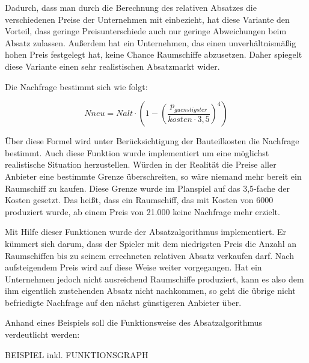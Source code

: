 Dadurch, dass man durch die Berechnung des relativen Absatzes die verschiedenen Preise der Unternehmen mit einbezieht, hat
diese Variante den Vorteil, dass geringe Preisunterschiede auch nur geringe Abweichungen beim Absatz zulassen. Außerdem hat
ein Unternehmen, das einen unverhältnismäßig hohen Preis festgelegt hat, keine Chance Raumschiffe abzusetzen. Daher spiegelt
diese Variante einen sehr realistischen Absatzmarkt wider.

Die Nachfrage bestimmt sich wie folgt:

\begin{equation}
     N{neu} = N{alt} \cdot (1 - (\frac{p_{guenstigster}}{kosten \cdot 3,5})^4)
     \label{alg:spielwelt-logik-absatzmengen-3}
\end{equation}

Über diese Formel wird unter Berücksichtigung der Bauteilkosten die Nachfrage bestimmt. Auch diese Funktion wurde implementiert
um eine möglichst realistische Situation herzustellen. Würden in der Realität die Preise aller Anbieter eine bestimmte Grenze
überschreiten, so wäre niemand mehr bereit ein Raumschiff zu kaufen. Diese Grenze wurde im Planspiel auf das 3,5-fache der Kosten
gesetzt. Das heißt, dass ein Raumschiff, das mit Kosten von 6000\curr{} produziert wurde, ab einem Preis von 21.000\curr{} keine
Nachfrage mehr erzielt.

Mit Hilfe dieser Funktionen wurde der Absatzalgorithmus implementiert. Er kümmert sich darum, dass der Spieler mit dem niedrigsten
Preis die Anzahl an Raumschiffen bis zu seinem errechneten relativen Absatz verkaufen darf. Nach aufsteigendem Preis wird auf
diese Weise weiter vorgegangen. Hat ein Unternehmen jedoch nicht ausreichend Raumschiffe produziert, kann es also dem ihm eigentlich
zustehenden Absatz nicht nachkommen, so geht die übrige nicht befriedigte Nachfrage auf den nächst günstigeren Anbieter über.

\bigskip

Anhand eines Beispiels soll die Funktionsweise des Absatzalgorithmus verdeutlicht werden:

BEISPIEL inkl. FUNKTIONSGRAPH